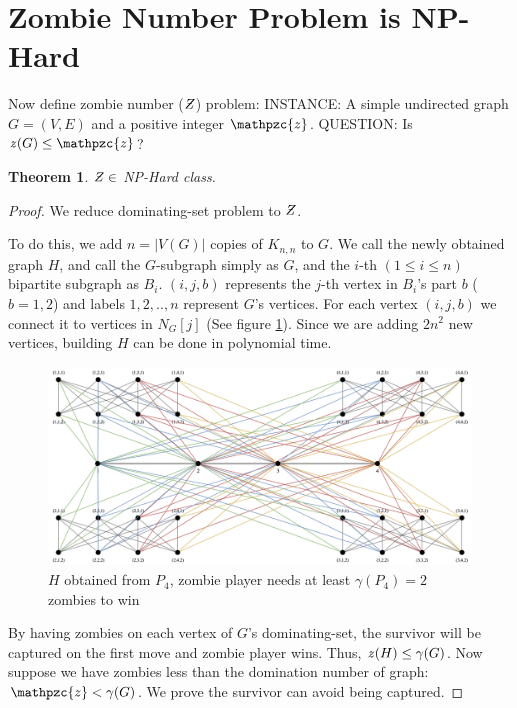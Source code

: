 \documentclass[1p]{elsarticle}
\newtheorem{theorem}{Theorem}
\newcommand{\NPZ}{\ooalign{$Z$\cr\hfil\rule[.8ex]{.3em}{.09ex}\hfil\cr}}
\newcommand{\zn}{\ooalign{$z$\cr\hfil\rule[.5ex]{.2em}{.08ex}\hfil\cr}}
\begin{document}
	\section{Zombie Number Problem is NP-Hard}\label{np-zombienumber}
	Now define zombie number ($\NPZ$) problem:
	{\newline}
	INSTANCE: A simple undirected graph $G = (V,E)$ and a positive integer $\mathpzc{z}$.
	{\newline}
	QUESTION: Is $\zn (G) \leq \mathpzc{z}$?

	\begin{theorem}
		$\NPZ \in$ NP-Hard class.
	\end{theorem}
	\begin{proof}
		We reduce dominating-set problem to $\NPZ$.

		To do this, we add $n = |V(G)|$ copies of $K_{n,n}$ to $G$. We call the newly obtained graph $H$, and call the
		$G$-subgraph simply as $G$, and the $i$-th $(1 \leq i \leq n)$ bipartite subgraph as $B_i$. $(i,j,b)$ represents
		the $j$-th vertex in $B_i$'s part $b$ ($b = 1,2$) and labels $1,2,..,n$ represent $G$'s vertices. For each vertex
		$(i,j,b)$ we connect it to vertices in $N_G[j]$ (See figure \ref{fig:p8}). Since we are adding $2n^2$ new
		vertices, building $H$ can be done in polynomial time.

		\begin{figure}[h!]
			\centering
			\includegraphics[width=0.9\linewidth]{fig/sec5.png}
			\caption{$H$ obtained from $P_4$, zombie player needs at least $\gamma(P_4) = 2$ zombies to win}
			\label{fig:p8}
		\end{figure}

		By having zombies on each vertex of $G$'s dominating-set, the survivor will be captured on the first move and zombie
		player wins. Thus, $\zn(H) \leq \gamma(G)$. Now suppose we have zombies less than the domination number of
		graph: $\mathpzc{z} < \gamma(G)$. We prove the survivor can avoid being captured.
		

\end{proof}
\end{document}
